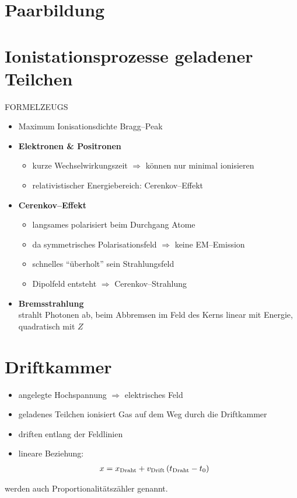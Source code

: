\documentclass[BCOR=5mm,DIV=calc,listof=totoc,headings=big]{scrartcl}
\begin{document}
\section{Paarbildung}
\label{sec:paarbildung}

\section{Ionistationsprozesse geladener Teilchen}
\label{sec:ionist-gelad-teilch}
FORMELZEUGS

\begin{itemize}
\item Maximum Ionisationsdichte Bragg--Peak
\item \textbf{Elektronen \& Positronen}
  \begin{itemize}
  \item kurze Wechselwirkungszeit $\Rightarrow$ können nur minimal ionisieren
  \item relativistischer Energiebereich: Cerenkov--Effekt
  \end{itemize}
\item \textbf{Cerenkov--Effekt}
  \begin{itemize}
  \item langsames \Pelectron polarisiert beim Durchgang Atome
  \item da symmetrisches Polarisationsfeld $\Rightarrow$ keine EM--Emission
  \item schnelles \Pelectron "`überholt"' sein Strahlungsfeld
  \item Dipolfeld entsteht $\Rightarrow$ Cerenkov--Strahlung
  \end{itemize}
\item \textbf{Bremsstrahlung}\\
  \Pelectron strahlt Photonen ab, beim Abbremsen im Feld des Kerns
  linear mit Energie, quadratisch mit $Z$
\end{itemize}

\section{Driftkammer}
\label{sec:driftkammer}
\begin{itemize}
\item angelegte Hochspannung $\Rightarrow$ elektrisches Feld
\item geladenes Teilchen ionisiert Gas auf dem Weg durch die Driftkammer
\item \Pelectron driften entlang der Feldlinien
\item lineare Beziehung:
  \begin{align*}
    x&=x_{\text{Draht}}+v_{\text{Drift}}\del{t_{\text{Draht}}-t_{0}}
  \end{align*}
\end{itemize}
werden auch Proportionalitätszähler genannt. 
\end{document}
